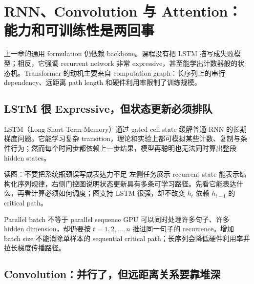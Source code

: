 \section{RNN、Convolution 与 Attention：能力和可训练性是两回事}

上一章的通用 formulation 仍依赖 backbone。课程没有把 LSTM 描写成失败模型；相反，它强调 recurrent network 非常 expressive，甚至能学出计数器般的状态机。Transformer 的动机主要来自 computation graph：长序列上的串行 dependency、远距离 path length 和硬件利用率限制了训练规模。

\subsection{LSTM 很 Expressive，但状态更新必须排队}

LSTM（Long Short-Term Memory）通过 gated cell state 缓解普通 RNN 的长期梯度问题。它能学习复杂 transition，理论和实验上都可模拟某些计数、复制与条件行为；然而每个时间步都依赖上一步结果，模型再聪明也无法同时算出整段 hidden states。


\begin{knowledgebox}{读图：不要把系统瓶颈误写成表达力不足}
左侧任务展示 recurrent state 能表示结构化序列规律，右侧门控图说明状态更新具有多条可学习路径。先看它能表达什么，再看计算必须如何调度；图支持 LSTM 很强，却不改变 $h_t$ 依赖 $h_{t-1}$ 的 critical path。
\end{knowledgebox}


\begin{warningbox}{Parallel batch 不等于 parallel sequence}
GPU 可以同时处理许多句子、许多 hidden dimension，却仍要按 $t=1,2,\ldots,n$ 推进同一句子的 recurrence。增加 batch size 不能消除单样本的 sequential critical path；长序列会降低硬件利用率并拉长梯度传播路径。
\end{warningbox}


\subsection{Convolution：并行了，但远距离关系要靠堆深}

